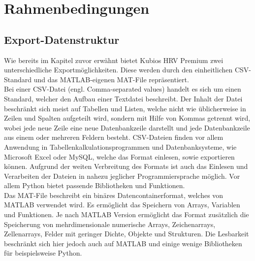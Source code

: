 
\chapter{Rahmenbedingungen}


\section{Export-Datenstruktur}

Wie bereits im Kapitel zuvor erwähnt bietet Kubios HRV Premium zwei unterschiedliche Exportmöglichkeiten. Diese werden durch den einheitlichen CSV-Standard und das MATLAB-eigenen MAT-File repräsentiert.\\
Bei einer CSV-Datei (engl. Comma-separated values) handelt es sich um einen Standard, welcher den Aufbau einer Textdatei beschreibt. Der Inhalt der Datei beschränkt sich meist auf Tabellen und Listen, welche nicht wie üblicherweise in Zeilen und Spalten aufgeteilt wird, sondern mit Hilfe von Kommas getrennt wird, wobei jede neue Zeile eine neue Datenbankzeile darstellt und jede Datenbankzeile aus einem oder mehreren Feldern besteht. CSV-Dateien finden vor allem Anwendung in Tabellenkalkulationsprogrammen und Datenbanksysteme, wie Microsoft Excel oder MySQL, welche das Format einlesen, sowie exportieren können. Aufgrund der weiten Verbreitung des Formats ist auch das Einlesen und Verarbeiten der Dateien in nahezu jeglicher Programmiersprache möglich. Vor allem Python bietet passende Bibliotheken und Funktionen.\cite{csv}\\
Das MAT-File beschreibt ein binäres Datencontainerformat, welches von MATLAB verwendet wird. Es ermöglicht das Speichern von Arrays, Variablen und Funktionen. Je nach MATLAB Version ermöglicht das Format zusätzlich die Speicherung von mehrdimensionale numerische Arrays, Zeichenarrays, Zellenarrays, Felder mit geringer Dichte, Objekte und Strukturen. Die Lesbarkeit beschränkt sich hier jedoch auch auf MATLAB und einige wenige Bibliotheken für beispielsweise Python.\cite{mat}

